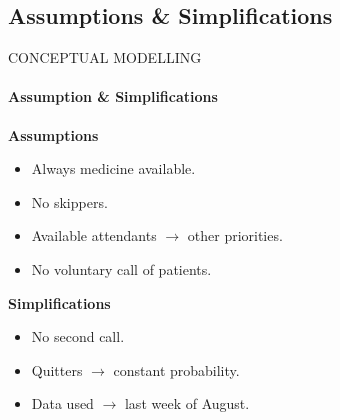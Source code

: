 \subsection{Assumptions \& Simplifications}
\begin{frame}{CONCEPTUAL MODELLING}
    \framesubtitle{Assumption \& Simplifications}
    \textbf{Assumptions}
    \begin{itemize}
    \item Always medicine available.
    \item No skippers.
    \item Available attendants $\rightarrow$ other priorities.
    \item No voluntary call of patients.
    \end{itemize}
    
    \vspace{0.5cm}
    \textbf{Simplifications}
    \begin{itemize}
    \item No second call.
    \item Quitters $\rightarrow$ constant probability.
    \item Data used $\rightarrow$ last week of August.
    \end{itemize}
    \end{frame}